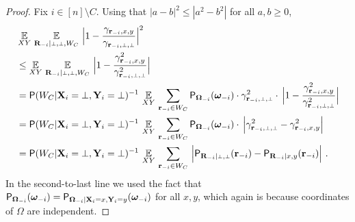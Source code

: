 \begin{proof}
	Fix $i \in [n] \setminus C$. Using that $|a - b|^2 \leq |a^2 - b^2|$ for all $a,b \geq 0$, 
	\begin{align}
		&\Ex_{XY} \, \Ex_{\bR_\mi | \dummy, \dummy, W_C} \, \Big | 1 - \frac{\gamma_{\br_\mi, x,y}}{\gamma_{\br_\mi,\dummy,\dummy}} \Big |^2 \notag \\
		&\leq \Ex_{XY} \, \Ex_{\bR_\mi | \dummy, \dummy, W_C} \, \Big | 1 - \frac{\gamma_{\br_\mi, x,y}^2}{\gamma_{\br_\mi,\dummy,\dummy}^2} \Big | \label{eq:nac-1} \\
		&= \P(W_C |\bX_i = \dummy, \bY_i = \dummy)^{-1} \,\Ex_{XY} \,\sum_{\br_\mi \in W_C} \P_{\bOmega_\mi}(\bomega_\mi) \cdot \gamma_{\br_\mi,\dummy,\dummy}^2 \cdot \, \Big | 1 - \frac{\gamma_{\br_\mi, x,y}^2}{\gamma_{\br_\mi,\dummy,\dummy}^2} \Big | \notag \\
		&= \P(W_C |\bX_i = \dummy, \bY_i = \dummy)^{-1} \, \Ex_{XY} \,\sum_{\br_\mi \in W_C} \P_{\bOmega_\mi}(\bomega_\mi) \cdot \, \Big | \gamma_{\br_\mi,\dummy,\dummy}^2 - \gamma_{\br_\mi, x,y}^2 \Big | \notag \\
		&= \P(W_C |\bX_i = \dummy, \bY_i = \dummy)^{-1} \, \Ex_{XY} \,\sum_{\br_\mi \in W_C} \, \Big | \P_{\bR_\mi | \dummy,\dummy}(\br_\mi) - \P_{\bR_\mi | x,y}(\br_\mi) \Big |~. \label{eq:norms-are-close-0a}
	\end{align}
	In the second-to-last line we used the fact that $\mathsf{P}_{{\boldsymbol{\Omega}}_{-i}}({\boldsymbol{\omega}}_{-i}) = \mathsf{P}_{{\boldsymbol{\Omega}}_{-i} | \mathbf{X}_i = x, \mathbf{Y}_i = y}({\boldsymbol{\omega}}_{-i})$ for all $x,y$, which again is because coordinates of $\Omega$ are independent.  


\end{proof}

